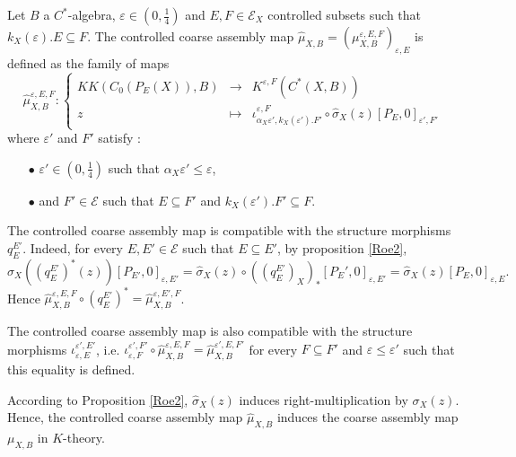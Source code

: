\begin{definition}
Let $B$ a $C^*$-algebra, $\varepsilon\in (0,\frac{1}{4})$ and $E,F\in\mathcal E_X$ controlled subsets such that $k_X(\varepsilon).E\subseteq F$. The controlled coarse assembly map $\hat\mu_{X,B}=(\mu_{X,B}^{\varepsilon,E,F})_{\varepsilon,E}$ is defined as the family of maps
\[\hat\mu_{X,B}^{\varepsilon, E,F} :\left\{\begin{array}{rcl} KK(C_0(P_E(X)),B) & \rightarrow & K^{\varepsilon, F}(C^*(X,B)) \\
					z & \mapsto & \iota_{\alpha_X \varepsilon',k_X(\varepsilon').F'}^{\varepsilon,F}\circ\hat\sigma_X(z)[P_{E},0]_{\varepsilon', F'}\end{array}\right.\]
where $\varepsilon'$ and $F'$ satisfy :
\begin{itemize}
\item[$\bullet$] $\varepsilon'\in (0,\frac{1}{4})$ such that $\alpha_X \varepsilon'\leq \varepsilon$,
\item[$\bullet$] and $F'\in\mathcal E$ such that $E\subseteq F'$ and $k_X(\varepsilon').F'\subseteq F$.
\end{itemize}
\end{definition}

\begin{rk} The controlled coarse assembly map is compatible with the structure morphisms $q_E^{E'}$. Indeed, for every $E,E'\in \mathcal E$ such that $E\subseteq E'$, by proposition \ref{Roe2}, 
\[\hat\sigma_X((q_E^{E'})^*(z))[P_{E'},0]_{\varepsilon,E'}  = \hat\sigma_X(z)\circ ((q_E^{E'})_X)_*[P_E',0]_{\varepsilon,E'}= \hat\sigma_X(z)[P_E,0]_{\varepsilon,E}.\] 
Hence $\hat\mu_{X,B}^{\varepsilon,E,F}\circ(q_E^{E'})^* =\hat\mu_{X,B}^{\varepsilon,E',F}$.
\end{rk}

\begin{rk} The controlled coarse assembly map is also compatible with the structure morphisms $\iota_{\varepsilon,E}^{\varepsilon',E'}$, i.e. $\iota_{\varepsilon,F}^{\varepsilon',F'}\circ\hat\mu_{X,B}^{\varepsilon,E,F} =\hat\mu_{X,B}^{\varepsilon',E,F'}$ for every $F\subseteq F'$ and $\varepsilon\leq \varepsilon'$ such that this equality is defined. 
\end{rk}

\begin{rk}According to Proposition \ref{Roe2}, $\hat\sigma_X(z)$ induces right-multiplication by $\sigma_X(z)$. Hence, the controlled coarse assembly map $\hat \mu_{X,B}$ induces the coarse assembly map $\mu_{X,B}$ in $K$-theory.
\end{rk}

